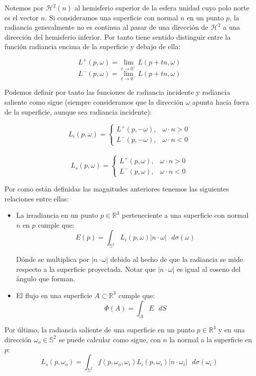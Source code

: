 \begin{itemize}
  Notemos por $\mathcal{H}^2(n)$ al hemisferio superior de la esfera unidad cuyo polo norte es el vector $n$. Si consideramos una superficie con normal $n$ en un punto $p$, la radiancia generalmente no es continua al pasar de una dirección de $\mathcal{H}^2$ a una dirección del hemisferio inferior. Por tanto tiene sentido distinguir entre la función radiancia encima de la superficie y debajo de ella:

  $$L^+(p,\omega) = \lim_{t\rightarrow 0^+} L(p+tn, \omega)$$
  $$L^-(p,\omega) = \lim_{t\rightarrow 0^-} L(p+tn, \omega)$$

  Podemos definir por tanto las funciones de radiancia incidente y radiancia saliente como sigue (siempre consideramos que la dirección $\omega$ apunta hacia fuera de la superficie, aunque sea radiancia incidente):

  \[ L_i(p,\omega) = 
   \begin{cases} 
      L^+(p,- \omega ),  & \omega \cdot n > 0 \\
      L^-(p,- \omega ),  & \omega \cdot n < 0
   \end{cases}
  \] 
  \\
  \[L_s(p,\omega) = 
   \begin{cases} 
      L^+(p, \omega ),  & \omega \cdot n > 0 \\
      L^-(p,\omega ),  & \omega \cdot n < 0
   \end{cases}
  \] 
  
\end{itemize}

Por como están definidas las magnitudes anteriores tenemos las siguientes relaciones entre ellas:

\begin{itemize}
\item La irradiancia en un punto $p\in \mathds{R}^3$ perteneciente a una superficie con normal $n$ en $p$ cumple que:
  $$ E(p) = \int _{\mathds{S}^2} L_i(p,\omega ) |n \cdot \omega| \text{ } d\sigma(\omega )$$

  Dónde se multiplica por $| n\cdot \omega |$ debido al hecho de que la radiancia se mide respecto a la superficie proyectada. Notar que $| n\cdot \omega |$ es igual al coseno del ángulo que forman.

\item El flujo en una superficie $A\subset \mathds{R}^3$ cumple que:
  $$\Phi (A)= \int _A E\text{ }dS$$
\end{itemize}

Por último, la radiancia saliente de una superficie en un punto $p \in \mathds{R}^3$ y en una dirección $\omega _o \in \mathds{S}^2$ se puede calcular como sigue, con $n$ la normal a la superficie en $p$:
\begin{equation}\label{dispersion}
L_s(p,\omega _o) = \int _{\mathds{S}^2}f(p,\omega _o, \omega _i) L_i(p, \omega _i) |n\cdot \omega _i|\text{ }d\sigma (\omega _i)
\end{equation}

